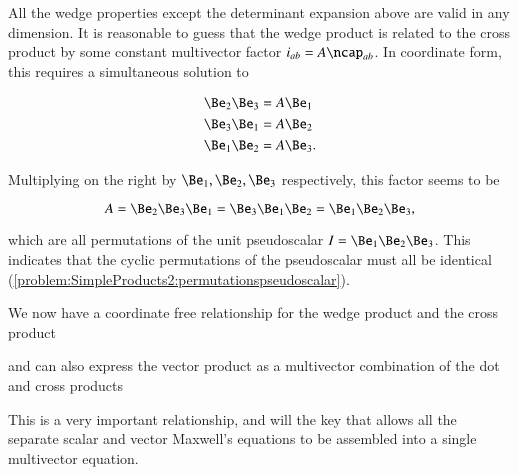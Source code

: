 All the wedge properties except the determinant expansion above are valid in any dimension.
It is reasonable to guess that the  wedge product is related to the cross product by some constant multivector factor \( i_{ab} = A \ncap_{ab} \).  In coordinate form, this requires a simultaneous solution to

\begin{dmath}\label{eqn:SimpleProducts2:1580}
\begin{aligned}
\Be_2 \Be_3 &= A \Be_1 \\
\Be_3 \Be_1 &= A \Be_2 \\
\Be_1 \Be_2 &= A \Be_3.
\end{aligned}
\end{dmath}

Multiplying on the right by \( \Be_1, \Be_2, \Be_3 \) respectively, this factor seems to be

\begin{equation}\label{eqn:SimpleProducts2:1600}
A = \Be_2 \Be_3 \Be_1 = \Be_3 \Be_1 \Be_2 = \Be_1 \Be_2 \Be_3,
\end{equation}

which are all permutations of the  unit pseudoscalar \( I = \Be_1 \Be_2 \Be_3 \).
This indicates that the cyclic permutations of the  pseudoscalar must all be identical (\cref{problem:SimpleProducts2:permutationspseudoscalar}).

We now have a coordinate free relationship for the  wedge product and the cross product


and can also express the
 vector product as a multivector combination of the dot and cross products


This is a very important relationship, and will the key that allows 
all the separate scalar and vector Maxwell's equations to be assembled into a single multivector equation.



